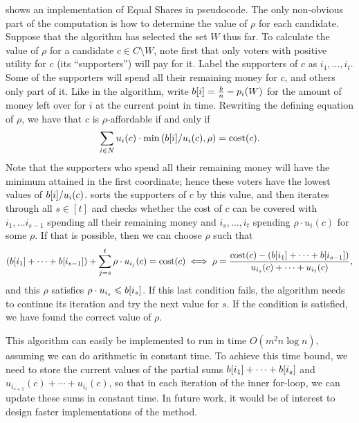 \documentclass[10pt]{scrartcl}
\renewcommand*{\le}{\leqslant}
\newcommand{\cost}{{{\mathrm{cost}}}}
\theoremstyle{definition}
\theoremstyle{plain}
\begin{document}
 shows an implementation of Equal Shares in pseudocode. The only non-obvious part of the computation is how to determine the value of $\rho$ for each candidate. Suppose that the algorithm has selected the set $W$ thus far. To calculate the value of $\rho$ for a candidate $c \in C \setminus W$,
note first that only voters with positive utility for $c$ (its ``supporters'') will pay for it. Label the supporters of $c$ as $i_1, \dots, i_t$. Some of the supporters will spend all their remaining money for $c$, and others only part of it. Like in the algorithm, write $b[i] = \frac{b}{n} - p_i(W)$ for the amount of money left over for $i$ at the current point in time. Rewriting the defining equation of $\rho$, we have that $c$ is $\rho$-affordable if and only if
\begin{align*}
	\sum_{i \in N}  u_i(c) \cdot  \min \left( \money[i]/u_i(c), \rho \right) = \cost(c) \text{.}
\end{align*}
Note that the supporters who spend all their remaining money will have the minimum attained in the first coordinate; hence these voters have the lowest values of $b[i]/u_i(c)$.  sorts the supporters of $c$ by this value, and then iterates through all $s \in [t]$ and checks whether the cost of $c$ can be covered with $i_1, \dots i_{s-1}$ spending all their remaining money and $i_s, \dots, i_t$ spending $\rho \cdot u_i(c)$ for some $\rho$. If that is possible, then we can choose $\rho$ such that
\begin{align*}
(\money[i_1] + \cdots + \money[i_{s-1}] ) + \sum_{j = s}^t  \rho \cdot u_{i_j}(c) = \cost(c) \iff 
\rho = \frac{\cost(c) - (\money[i_1] + \cdots + \money[i_{s-1}] )}{u_{i_{s}}(c) + \cdots + u_{i_t}(c)} \text{,}
\end{align*}
and this $\rho$ satisfies $\rho \cdot u_{i_s} \le \money[i_s]$. If this last condition fails, the algorithm needs to continue its iteration and try the next value for $s$. If the condition is satisfied, we have found the correct value of $\rho$.


This algorithm can easily be implemented to run in time $O(m^2n\log n)$, assuming we can do arithmetic in constant time. To achieve this time bound, we need to store the current values of the partial sums $b[i_1] + \cdots + b[i_{s}]$ and $u_{i_{s+1}}(c) + \cdots + u_{i_t}(c)$, so that in each iteration of the inner for-loop, we can update these sums in constant time. 
In future work, it would be of interest to design faster implementations of the method.
\end{document}
